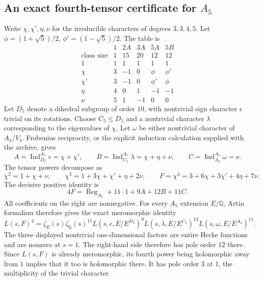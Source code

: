 \subsection{An exact fourth-tensor certificate for \texorpdfstring{$A_5$}{A5}}
Write $\chi,\chi',\eta,\nu$ for the irreducible characters of degrees
$3,3,4,5$. Let $\phi=(1+\sqrt5)/2$, $\phi'=(1-\sqrt5)/2$. The table is
\[
\begin{array}{c|rrrrr}
 &1&2A&3A&5A&5B\\\hline
\text{class size}&1&15&20&12&12\\
1&1&1&1&1&1\\
\chi&3&-1&0&\phi&\phi'\\
\chi'&3&-1&0&\phi'&\phi\\
\eta&4&0&1&-1&-1\\
\nu&5&1&-1&0&0
\end{array}
\]
Let $D_5$ denote a dihedral subgroup of order $10$, with nontrivial sign
character $\epsilon$ trivial on its rotations. Choose $C_5\le D_5$ and a
nontrivial character $\lambda$ corresponding to the eigenvalues of $\chi$.
Let $\omega$ be either nontrivial character of $A_4/V_4$. Frobenius
reciprocity, or the explicit induction calculation supplied with the
archive, gives
\[
 A=\operatorname{Ind}_{D_5}^{A_5}\epsilon=\chi+\chi',\qquad
 B=\operatorname{Ind}_{C_5}^{A_5}\lambda=\chi+\eta+\nu,\qquad
 C=\operatorname{Ind}_{A_4}^{A_5}\omega=\nu.
\]
The tensor powers decompose as
\[
 \chi^2=1+\chi+\nu,\qquad
 \chi^3=1+3\chi+\chi'+\eta+2\nu,\qquad
 F=\chi^4=3+6\chi+3\chi'+4\eta+7\nu.
\]
The decisive positive identity is
\begin{equation}\label{eq:a5-fourth-certificate}
 \boxed{\ 4F=\operatorname{Reg}_{A_5}+11\cdot1+9A+12B+11C.\ }
\end{equation}
All coefficients on the right are nonnegative. For every $A_5$ extension
$E/\mathbb Q$, Artin formalism therefore gives the exact meromorphic identity
\begin{equation}\label{eq:a5-artin-product}
 L(s,F)^4=\zeta_E(s)\zeta_{\mathbb Q}(s)^{11}
 L(s,\epsilon,E/E^{D_5})^9
 L(s,\lambda,E/E^{C_5})^{12}
 L(s,\omega,E/E^{A_4})^{11}.
\end{equation}
The three displayed nontrivial one-dimensional factors are entire Hecke
functions and are nonzero at $s=1$. The right-hand side therefore has
pole order $12$ there. Since $L(s,F)$ is already meromorphic, its fourth power being
holomorphic away from $1$ implies that it too is holomorphic there.
It has pole order $3$ at $1$, the multiplicity of the trivial character.

